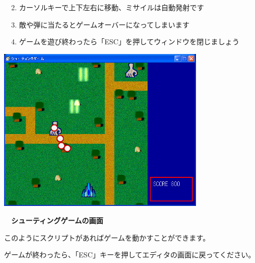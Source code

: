 \documentclass[a4paper,dvipdfmx]{jarticle}
\newcommand\textstyleqwerty[1]{#1}
\begin{document}
\ \ 2.
カーソルキーで上下左右に移動、ミサイルは自動発射です

\ \ 3.
敵や弾に当たるとゲームオーバーになってしまいます

\ \ 4.
ゲームを遊び終わったら「ESC」を押してウィンドウを閉じましょう


\bigskip



\begin{center}
\includegraphics[width=9.962cm,height=7.902cm]{text02-img/text02-img012.png}

\end{center}

\bigskip


\bigskip


\bigskip


\bigskip


\bigskip


\bigskip


\bigskip


\bigskip


\bigskip


\bigskip


\bigskip


\bigskip


\bigskip


\bigskip


\bigskip

\textstyleqwerty{\textbf{　シューティングゲームの画面}}


\bigskip


\bigskip


\bigskip

このようにスクリプトがあればゲームを動かすことができます。

ゲームが終わったら、「ESC」キーを押してエディタの画面に戻ってください。
\end{document}

